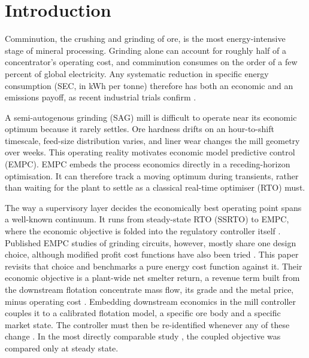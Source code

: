 \documentclass[conference]{IEEEtran}
\begin{document}
\section{Introduction}

Comminution, the crushing and grinding of ore, is the most energy-intensive
stage of mineral processing. Grinding alone can account for roughly half of
a concentrator's operating cost, and comminution consumes on the order of a
few percent of global electricity. Any systematic reduction in specific
energy consumption (SEC, in kWh per tonne) therefore has both an
economic and an emissions payoff, as recent industrial trials
confirm \cite{pinto2025,costa2025}.

A semi-autogenous grinding (SAG) mill is difficult to operate near its
economic optimum because it rarely settles. Ore hardness drifts on an
hour-to-shift timescale, feed-size distribution varies, and liner wear
changes the mill geometry over weeks. This operating reality motivates
economic model predictive control (EMPC). EMPC embeds the process
economics directly in a receding-horizon optimisation. It can therefore
track a moving optimum during transients, rather than waiting for the
plant to settle as a classical real-time optimiser (RTO) must.

The way a supervisory layer decides the economically best operating point
spans a well-known continuum. It runs from steady-state RTO (SSRTO) to
EMPC, where the economic objective is folded into the regulatory
controller itself \cite{matias2022,ellis2017}. Published EMPC studies of
grinding circuits, however, mostly share one design choice, although
modified profit cost functions have also been tried \cite{thivierge2023}.
This paper revisits that choice and benchmarks a pure energy cost
function against it. Their economic objective is a plant-wide net
smelter return, a revenue term built from the downstream flotation
concentrate mass flow, its grade and the metal price, minus operating
cost \cite{leroux2019,thivierge2023}. Embedding downstream economics in the
mill controller couples it to a calibrated flotation model, a specific ore
body and a specific market state. The controller must then be
re-identified whenever any of these change \cite{mittermaier2025}. In the most directly comparable study
\cite{thivierge2023}, the coupled objective was compared only at steady
state.
\end{document}
